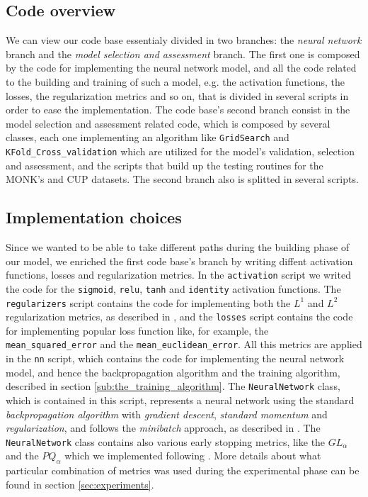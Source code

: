 \documentclass[11pt,twoside]{article}
\begin{document}
    \subsection{Code overview} %
    \label{sub:code_overview}
        We can view our code base essentialy divided in two branches: the \textit{neural network} branch and
        the \textit{model selection and assessment} branch. The first one is composed by the code for
        implementing the neural network model, and all the code related
        to the building and training of such a model, e.g. the activation functions, the losses, the
        regularization metrics and so on, that is divided in several scripts in order to ease the
        implementation. The code base's second branch consist in the model selection and assessment related
        code, which is composed by several classes, each one implementing an algorithm like \texttt{GridSearch}
        and \texttt{KFold\_Cross\_validation} which are utilized for the model's validation, selection and
        assessment, and the scripts that build up the testing routines for the MONK's and CUP datasets.
        The second branch also is splitted in several scripts.

    \subsection{Implementation choices} %
    \label{sub:implementation_choices}
        Since we wanted to be able to take different paths during the building phase of our model, we enriched
        the first code base's branch by writing diffent activation functions, losses and regularization metrics.
        In the \texttt{activation} script we writed the code for the \texttt{sigmoid}, \texttt{relu},
        \texttt{tanh} and \texttt{identity} activation functions. The \texttt{regularizers} script contains the
        code for implementing both the $L^1$ and $L^2$ regularization metrics, as described in
        \cite{deep_learning}, and the \texttt{losses} script contains the code for implementing popular loss
        function like, for example, the \texttt{mean\_squared\_error} and the \texttt{mean\_euclidean\_error}.
        All this metrics are applied in the \texttt{nn} script, which contains the code for implementing the
        neural network model, and hence the backpropagation algorithm and the training algorithm, described in
        section \ref{sub:the_training_algorithm}. The \texttt{NeuralNetwork} class, which is contained in this
        script, represents a neural network using the standard \textit{backpropagation algorithm} with
        \textit{gradient descent}, \textit{standard momentum} and \textit{regularization}, and follows the
        \textit{minibatch} approach, as described in \cite{deep_learning}. The \texttt{NeuralNetwork} class
        contains also various early stopping metrics, like the $GL_{\alpha}$ and the $PQ_{\alpha}$ which we
        implemented following \cite{early_stopping}. More details about what particular combination of
        metrics was used during the experimental phase can be found in section \ref{sec:experiments}.
\end{document}
